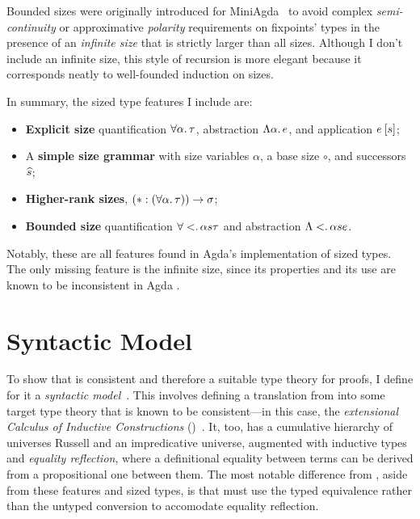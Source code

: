 Bounded sizes were originally introduced for MiniAgda~\citep{MiniAgda, flationary}
to avoid complex \emph{semi-continuity} or approximative \emph{polarity}
requirements on fixpoints' types in the presence of an \emph{infinite size}
that is strictly larger than all sizes.
Although I don't include an infinite size,
this style of recursion is more elegant because it corresponds neatly to well-founded induction on sizes.

In summary, the sized type features I include are:

\begin{itemize}[noitemsep]
  \item \textbf{Explicit size} quantification $\forall \alpha \mathpunct{.} \tau$,
    abstraction $\Lambda \alpha \mathpunct{.} e$, and
    application $\App{e}{s}$;
  \item A \textbf{simple size grammar} with size variables $\alpha$, a base size $\circ$, and successors $\widehat{s}$;
  \item \textbf{Higher-rank sizes}, \eg $\arr*{(\Funtype{\alpha}{\tau})}{\sigma}$;
  \item \textbf{Bounded size} quantification $\forall < \mathpunct{.} \alpha{s}{\tau}$ and
  abstraction $\Lambda < \mathpunct{.} \alpha{s}{e}$.
\end{itemize}

Notably, these are all features found in Agda's implementation of sized types.
The only missing feature is the infinite size,
since its properties and its use are known to be inconsistent in Agda%
\textsuperscript{}.

\section{Syntactic Model}\label{sec:syntactic-model}

To show that \lang is consistent and therefore a suitable type theory for proofs,
I define for it a \emph{syntactic model}~\citep{syntactic-models}.
This involves defining a translation from \lang into some target type theory
that is known to be consistent---in this case,
the \emph{extensional Calculus of Inductive Constructions}
(\CICE)~\citep{CCE, CICE}.
It, too, has a cumulative hierarchy of universes \ala Russell and an impredicative universe,
augmented with inductive types and \emph{equality reflection},
where a definitional equality between terms can be derived from a propositional one between them.
The most notable difference from \lang, aside from these features and sized types,
is that \CICE must use the typed equivalence rather than the untyped conversion
to accomodate equality reflection.

